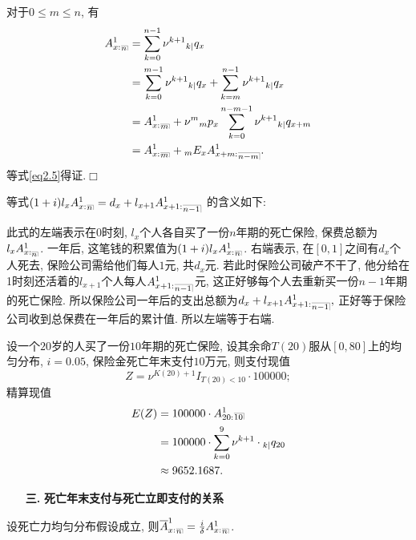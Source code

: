 \documentclass[a4paper,openany, 10pt]{ctexbook}
\makeatletter
\newcommand{\hei}{\CJKfamily{hei}}      %
\def\qed{\hfill$\Box$\medskip}
\DeclareRobustCommand{\annu}[1]{_{%
    \def\arraystretch{0}%
    \setlength\arraycolsep{1pt}%
    \setlength\arrayrulewidth{.2pt}%
    \begin{array}[b]{@{}c|}\hline
        \\[\arraycolsep]%
        \scriptstyle #1%
    \end{array}%
}}
\makeatother
\begin{document}
\proof
对于$0\leq m \leq n$, 有
\begin{align*}
    A_{x:}^1{}_{\annu{n}} & = \sum_{k=0}^{n-1}\nu^{k+1}{}_{k|}q_x                                        \\
                     & = \sum_{k=0}^{m-1}\nu^{k+1}{}_{k|}q_x + \sum_{k=m}^{n-1}\nu^{k+1}{}_{k|}q_x    \\
                     & = A_{x:}^1{}_{\annu m} +\nu^m {}_mp_x\sum_{k=0}^{n-m-1}\nu^{k+1}{}_{k|}q_{x+m} \\
                     & = A_{x:}^1{}_{\annu m} +{}_mE_xA_{x+m:}^1{}_{\annu{n-m}}.
\end{align*}
等式\eqref{eq2.5}得证.\qed
\begin{remark}
  等式$(1+i)l_x A_{x:}^1{}_{\annu{n}} = d_x + l_{x+1} A_{x+1:}^1{}_{\annu{n-1}}$ 的含义如下:

此式的左端表示在0时刻, $l_x$个人各自买了一份$n$年期的死亡保险, 保费总额为$l_x A_{x:\annu{n}}^1$. 一年后, 这笔钱的积累值为$(1+i)l_x A_{x:}^1{}_{\annu{n}}$. 右端表示, 在$[0,1]$之间有$d_x$个人死去, 保险公司需给他们每人$1$元, 共$d_x$元. 若此时保险公司破产不干了, 他分给在1时刻还活着的$l_{x+1}$个人每人$A_{x+1:}^1{}_{\annu{n-1}}$元, 这正好够每个人去重新买一份$n-1$年期的死亡保险. 所以保险公司一年后的支出总额为$d_x + l_{x+1} A_{x+1:}^1{}_{\annu{n-1}},$ 正好等于保险公司收到总保费在一年后的累计值. 所以左端等于右端.
\end{remark}


\begin{example}[均匀分布]
    设一个$20$岁的人买了一份$10$年期的死亡保险, 设其余命$T(20)$服从$[0,80]$上的均匀分布, $i = 0.05$, 保险金死亡年末支付$10$万元, 则支付现值
    $$
        Z = \nu^{K(20)+1}I_{T(20)<10}\cdot 100000;
    $$
    精算现值
    \begin{align*}
        E(Z) & = 100000\cdot A_{20:}^1{}\annu{10}                         \\
             & = 100000\cdot \sum_{k=0}^{9}{\nu^{k+1}\cdot {}_{k|}q_{20}} \\
             & \approx 9652.1687.
    \end{align*}
\end{example}

\begin{itemize}
    \item[{\bf\hei 三.}]{\bf\hei 死亡年末支付与死亡立即支付的关系}
\end{itemize}
\begin{proposition}\label{prop2.4}
    设死亡力均匀分布假设成立, 则$\overline{A}_{x:}^1{}_{\annu{n}}= \frac{i}{\delta}A_{x:}^1{}_{\annu{n}}$.
\end{proposition}
\end{document}
